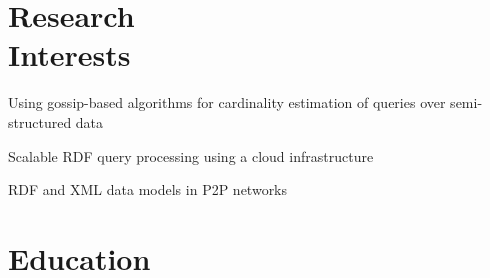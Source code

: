 \documentclass[margin,line]{resume}
\begin{document}
\address{
+1-816-255-0338 \ \ \ \ \ vgslavov@umkc.edu \ \ \ \ \ http://v.web.umkc.edu/vsfgd
}
\begin{resume}

%

    \section{\mysidestyle Research\\Interests}
    \begin{list2}
        \item Using gossip-based algorithms for cardinality estimation of queries over semi-structured data
        \item Scalable RDF query processing using a cloud infrastructure
        \item RDF and XML data models in P2P networks
    \end{list2}\vspace{-1.5mm}
   
    \section{\mysidestyle Education}


\end{resume}
\end{document}
